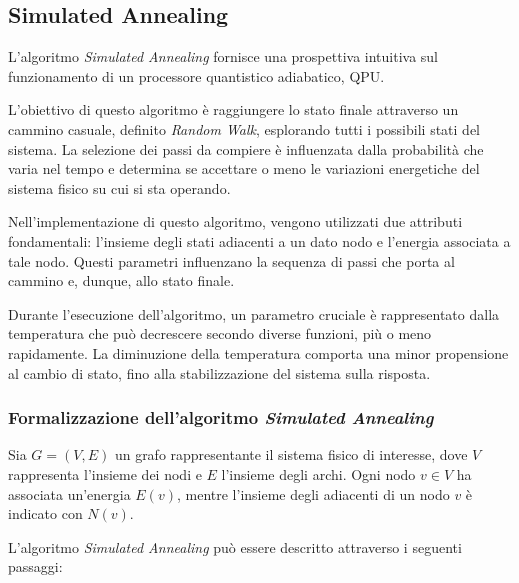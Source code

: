 \documentclass{article}
\begin{document}
\subsection{Simulated Annealing}

L'algoritmo \emph{Simulated Annealing} fornisce una prospettiva intuitiva sul funzionamento di un processore quantistico adiabatico, QPU.

L'obiettivo di questo algoritmo è raggiungere lo stato finale attraverso un cammino casuale, definito \emph{Random Walk}, esplorando tutti i possibili stati del sistema. La selezione dei passi da compiere è influenzata dalla probabilità che varia nel tempo e determina se accettare o meno le variazioni energetiche del sistema fisico su cui si sta operando.

Nell'implementazione di questo algoritmo, vengono utilizzati due attributi fondamentali: l'insieme degli stati adiacenti a un dato nodo e l'energia associata a tale nodo. Questi parametri influenzano la sequenza di passi che porta al cammino e, dunque, allo stato finale.

Durante l'esecuzione dell'algoritmo, un parametro cruciale è rappresentato dalla temperatura che può decrescere secondo diverse funzioni, più o meno rapidamente. La diminuzione della temperatura comporta una minor propensione al cambio di stato, fino alla stabilizzazione del sistema sulla risposta.

\subsubsection*{Formalizzazione dell'algoritmo \emph{Simulated Annealing}}

Sia $G=(V,E)$ un grafo rappresentante il sistema fisico di interesse, dove $V$ rappresenta l'insieme dei nodi e $E$ l'insieme degli archi. Ogni nodo $v \in V$ ha associata un'energia $E(v)$, mentre l'insieme degli adiacenti di un nodo $v$ è indicato con $N(v)$.

L'algoritmo \emph{Simulated Annealing} può essere descritto attraverso i seguenti passaggi:
\end{document}
